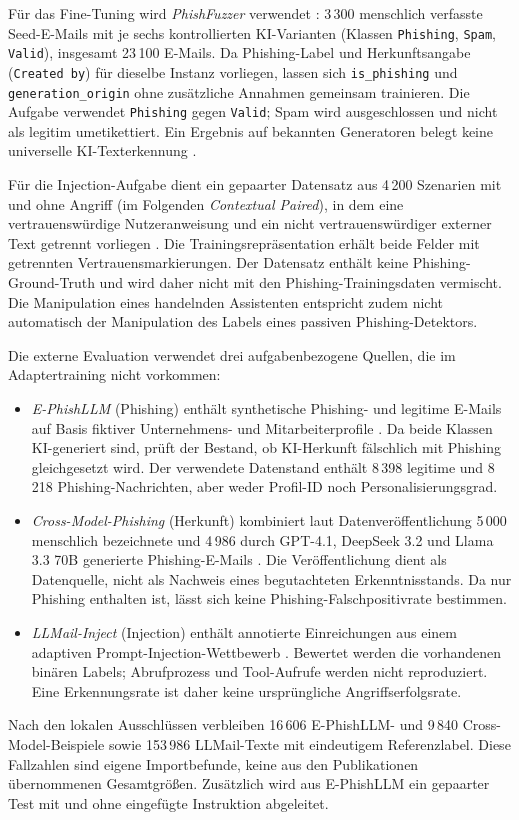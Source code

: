 \documentclass[12pt,twoside=false,a4paper,parskip]{scrbook}
\begin{document}
Für das Fine-Tuning wird \emph{PhishFuzzer} verwendet \cite{toth2025phishfuzzer}: 3\,300 menschlich verfasste Seed-E-Mails mit je sechs kontrollierten KI-Varianten (Klassen \texttt{Phishing}, \texttt{Spam}, \texttt{Valid}), insgesamt 23\,100 E-Mails. Da Phishing-Label und Herkunftsangabe (\texttt{Created by}) für dieselbe Instanz vorliegen, lassen sich \texttt{is\_phishing} und \texttt{generation\_origin} ohne zusätzliche Annahmen gemeinsam trainieren. Die Aufgabe verwendet \texttt{Phishing} gegen \texttt{Valid}; Spam wird ausgeschlossen und nicht als legitim umetikettiert. Ein Ergebnis auf bekannten Generatoren belegt keine universelle KI-Texterkennung \cite{sadasivan2023detection}.

Für die Injection-Aufgabe dient ein gepaarter Datensatz aus 4\,200 Szenarien mit und ohne Angriff (im Folgenden \emph{Contextual Paired}), in dem eine vertrauenswürdige Nutzeranweisung und ein nicht vertrauenswürdiger externer Text getrennt vorliegen \cite{abdelnabi2026agents}. Die Trainingsrepräsentation erhält beide Felder mit getrennten Vertrauensmarkierungen. Der Datensatz enthält keine Phishing-Ground-Truth und wird daher nicht mit den Phishing-Trainingsdaten vermischt. Die Manipulation eines handelnden Assistenten entspricht zudem nicht automatisch der Manipulation des Labels eines passiven Phishing-Detektors.

Die externe Evaluation verwendet drei aufgabenbezogene Quellen, die im Adaptertraining nicht vorkommen:
\begin{itemize}
  \item \emph{E-PhishLLM} (Phishing) enthält synthetische Phishing- und legitime E-Mails auf Basis fiktiver Unternehmens- und Mitarbeiterprofile \cite{pajola2025ephishgen}. Da beide Klassen KI-generiert sind, prüft der Bestand, ob KI-Herkunft fälschlich mit Phishing gleichgesetzt wird. Der verwendete Datenstand enthält 8\,398 legitime und 8\,218 Phishing-Nachrichten, aber weder Profil-ID noch Personalisierungsgrad.
  \item \emph{Cross-Model-Phishing} (Herkunft) kombiniert laut Datenveröffentlichung 5\,000 menschlich bezeichnete und 4\,986 durch GPT-4.1, DeepSeek 3.2 und Llama 3.3 70B generierte Phishing-E-Mails \cite{gutierrez2026crossmodel}. Die Veröffentlichung dient als Datenquelle, nicht als Nachweis eines begutachteten Erkenntnisstands. Da nur Phishing enthalten ist, lässt sich keine Phishing-Falschpositivrate bestimmen.
  \item \emph{LLMail-Inject} (Injection) enthält annotierte Einreichungen aus einem adaptiven Prompt-Injection-Wettbewerb \cite{abdelnabi2025llmail}. Bewertet werden die vorhandenen binären Labels; Abrufprozess und Tool-Aufrufe werden nicht reproduziert. Eine Erkennungsrate ist daher keine ursprüngliche Angriffserfolgsrate.
\end{itemize}
Nach den lokalen Ausschlüssen verbleiben 16\,606 E-PhishLLM- und 9\,840 Cross-Model-Beispiele sowie 153\,986 LLMail-Texte mit eindeutigem Referenzlabel. Diese Fallzahlen sind eigene Importbefunde, keine aus den Publikationen übernommenen Gesamtgrößen. Zusätzlich wird aus E-PhishLLM ein gepaarter Test mit und ohne eingefügte Instruktion abgeleitet.
\end{document}
